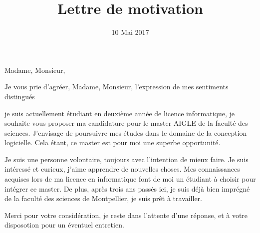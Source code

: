 \documentclass[11pt,a4paper,sans]{moderncv}
\title{Lettre de motivation}
\begin{document}
\date{10 Mai 2017}
\opening{Madame, Monsieur,}
\closing{Je vous prie d'agréer, Madame, Monsieur, l'expression de mes sentiments distingués}
\makelettertitle

je suis actuellement étudiant en deuxième année de licence informatique, je souhaite vous proposer ma candidature pour le master AIGLE de la faculté des sciences. J'envisage de poursuivre mes études dans le domaine de la conception logicielle. Cela étant, ce master est pour moi une superbe opportunité. 

Je suis une personne volontaire, toujours avec l'intention de mieux faire. Je suis intéressé et curieux, j'aime apprendre de nouvelles choses. Mes connaissances acquises lors de ma licence en informatique font de moi un étudiant à choisir pour intégrer ce master. De plus, après trois ans passés ici, je suis déjà bien imprégné de la faculté des sciences de Montpellier, je suis prêt à travailler.

Merci pour votre considération, je reste dans l'attente d'une réponse, et à votre disposotion pour un éventuel entretien.

\makeletterclosing
\end{document}
